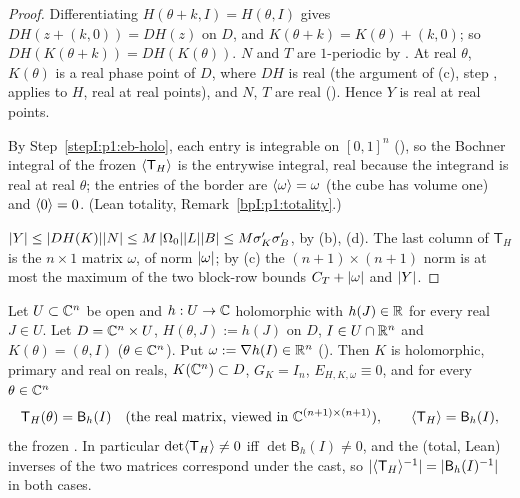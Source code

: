 \begin{proof}
\label{stepI:p1:eb-period}
Differentiating $H(\theta+k,I)=H(\theta,I)$ gives $DH(z+(k,0))=DH(z)$ on $D$, and $K(\theta+k)=K(\theta)+(k,0)$;
so $DH(K(\theta+k))=DH(K(\theta))$. $N$ and $T$ are $1$-periodic by . At real $\theta$,
$K(\theta)$ is a real phase point of $D$, where $DH$ is real (the argument of (c),
step , applies to $H$, real at real points), and $N$, $T$ are real
(). Hence $Y$ is real at real points.

\label{stepI:p1:eb-average}
\sloppy By Step~\ref{stepI:p1:eb-holo}, each entry is integrable on $[0,1]^n$
(), so the Bochner
integral of the frozen $\langle \mathsf T_H\rangle$ is the entrywise integral, real because the integrand is
real at real $\theta$; the entries of the border are $\langle \omega\rangle=\omega$ (the cube has volume one) and $\langle 0\rangle=0$.
(Lean totality, Remark~\ref{bpI:p1:totality}.)

\label{stepI:p1:eb-bounds}
$\lvert Y\rvert\le\lvert DH(K)\rvert\lvert N\rvert\le M\,\lvert \Omega_0\rvert\lvert L\rvert\lvert B\rvert\le M\sigma_K'\sigma_B'$, by (b), (d).
The last column of $\mathsf T_H$ is the $n\times1$ matrix $\omega$, of norm $\lvert \omega\rvert$; by
(c) the $(n+1)\times(n+1)$ norm is at most the maximum of the two block-row bounds
$C_T+\lvert \omega\rvert$ and $\lvert Y\rvert$.
\end{proof}

\begin{lemma}[$\mathsf T_H=\mathsf B_h$ at the trivial torus]\label{bpI:p1:trivial}
Let $U\subset\mathbb{C}^n$ be open and $h:U\to\mathbb{C}$ holomorphic with $h(J)\in\mathbb{R}$ for every real $J\in U$. Let
$D=\mathbb{C}^n\times U$, $H(\theta,J):=h(J)$ on $D$, $I\in U\cap\mathbb{R}^n$ and $K(\theta)=(\theta,I)$ ($\theta\in\mathbb{C}^n$). Put
$\omega:=\nabla h(I)\in\mathbb{R}^n$ (). Then $K$ is holomorphic, primary and real on reals, $K(\mathbb{C}^n)\subset D$,
$G_K=I_n$, $E_{H,K,\omega}\equiv0$, and for every $\theta\in\mathbb{C}^n$
\[
\mathsf T_H(\theta)=\mathsf B_h(I)\quad\text{(the real matrix, viewed in }\mathbb{C}^{(n+1)\times(n+1)}),\qquad
\langle \mathsf T_H\rangle=\mathsf B_h(I),
\]
the frozen . In particular $\det\langle \mathsf T_H\rangle\ne0$ iff $\det\mathsf B_h(I)\ne0$, and the (total, Lean) inverses of the two matrices correspond under the cast, so
$\lvert \langle \mathsf T_H\rangle^{-1}\rvert=\lvert \mathsf B_h(I)^{-1}\rvert$ in both cases.
\end{lemma}


